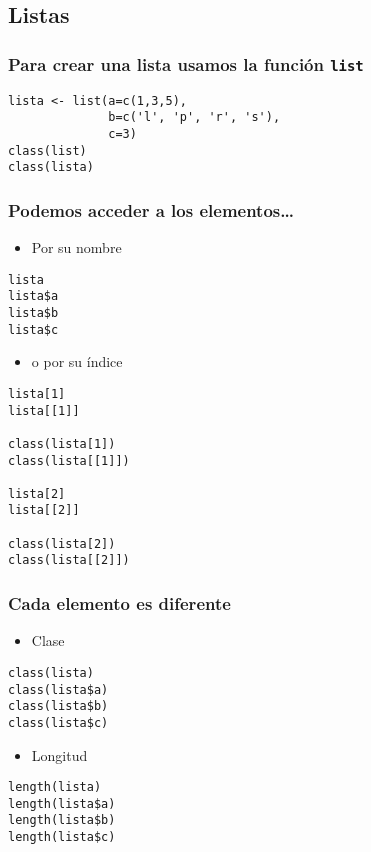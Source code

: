 \documentclass[xcolor={usenames,svgnames,dvipsnames}]{beamer}
\begin{document}
\subsection{Listas}
\label{sec-4-1}
\begin{frame}[fragile]
\frametitle{Para crear una lista usamos la función \texttt{list}}
\label{sec-4-1-1}


\lstset{language=R}
\begin{lstlisting}
lista <- list(a=c(1,3,5),
              b=c('l', 'p', 'r', 's'),
              c=3)
class(list)
class(lista)
\end{lstlisting}
\end{frame}
\begin{frame}[fragile]
\frametitle{Podemos acceder a los elementos\ldots{}}
\label{sec-4-1-2}

\begin{itemize}
\item Por su nombre
\end{itemize}

\lstset{language=R}
\begin{lstlisting}
lista
lista$a
lista$b
lista$c
\end{lstlisting}

\begin{itemize}
\item o por su índice
\end{itemize}

\lstset{language=R}
\begin{lstlisting}
lista[1]
lista[[1]]

class(lista[1])
class(lista[[1]])

lista[2]
lista[[2]]

class(lista[2])
class(lista[[2]])
\end{lstlisting}
\end{frame}
\begin{frame}[fragile]
\frametitle{Cada elemento es diferente}
\label{sec-4-1-3}

\begin{itemize}
\item Clase
\end{itemize}

\lstset{language=R}
\begin{lstlisting}
class(lista)
class(lista$a)
class(lista$b)
class(lista$c)
\end{lstlisting}
\begin{itemize}
\item Longitud
\end{itemize}

\lstset{language=R}
\begin{lstlisting}
length(lista)
length(lista$a)
length(lista$b)
length(lista$c)
\end{lstlisting}
\end{frame}
\end{document}
